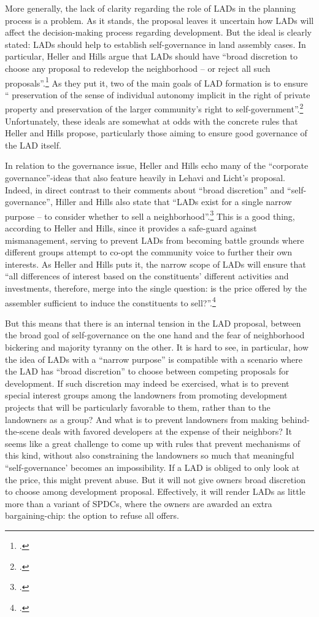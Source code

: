 \documentclass[12pt,a4paper]{book} %
\begin{document}
More generally, the lack of clarity regarding the role of LADs in the planning process is a problem. As it stands, the proposal leaves it uncertain how LADs will affect the decision-making process regarding development. But the ideal is clearly stated: LADs should help to establish self-governance in land assembly cases. In particular, Heller and Hills argue that LADs should have ``broad discretion to choose any proposal to redevelop the neighborhood -- or reject all such proposals''.\footcite[See][1496]{heller08} As they put it, two of the main goals of LAD formation is to ensure `` preservation of the sense of individual autonomy implicit in the right of private property and preservation of the larger community's right to self-government''.\footcite[See][1498]{heller08} Unfortunately, these ideals are somewhat at odds with the concrete rules that Heller and Hills propose, particularly those aiming to ensure good governance of the LAD itself. 

In relation to the governance issue, Heller and Hills echo many of the ``corporate governance''-ideas that also feature heavily in Lehavi and Licht's proposal. Indeed, in direct contrast to their comments about ``broad discretion'' and ``self-governance'', Hiller and Hills also state that ``LADs exist for a single narrow purpose -- to consider whether to sell a neighborhood''.\footcite[See][1500]{heller08} This is a good thing, according to Heller and Hills, since it provides a safe-guard against mismanagement, serving to prevent LADs from becoming battle grounds where different groups attempt to co-opt the community voice to further their own interests. As Heller and Hills puts it, the narrow scope of LADs will ensure that ``all differences of interest based on the constituents' different activities and investments, therefore, merge into the single question: is the price offered by the assembler sufficient to induce the constituents to sell?''.\footcite[1500]{heller08}

But this means that there is an internal tension in the LAD proposal, between the broad goal of self-governance on the one hand and the fear of neighborhood bickering and majority tyranny on the other. It is hard to see, in particular, how the idea of LADs with a ``narrow purpose'' is compatible with a scenario where the LAD has ``broad discretion'' to choose between competing proposals for development. If such discretion may indeed be exercised, what is to prevent special interest groups among the landowners from promoting development projects that will be particularly favorable to them, rather than to the landowners as a group? And what is to prevent landowners from making behind-the-scene deals with favored developers at the expense of their neighbors? It seems like a great challenge to come up with rules that prevent mechanisms of this kind, without also constraining the landowners so much that meaningful ``self-governance' becomes an impossibility. If a LAD is obliged to only look at the price, this might prevent abuse. But it will not give owners broad discretion to choose among development proposal. Effectively, it will render LADs as little more than a variant of SPDCs, where the owners are awarded an extra bargaining-chip: the option to refuse all offers. 
\end{document}
